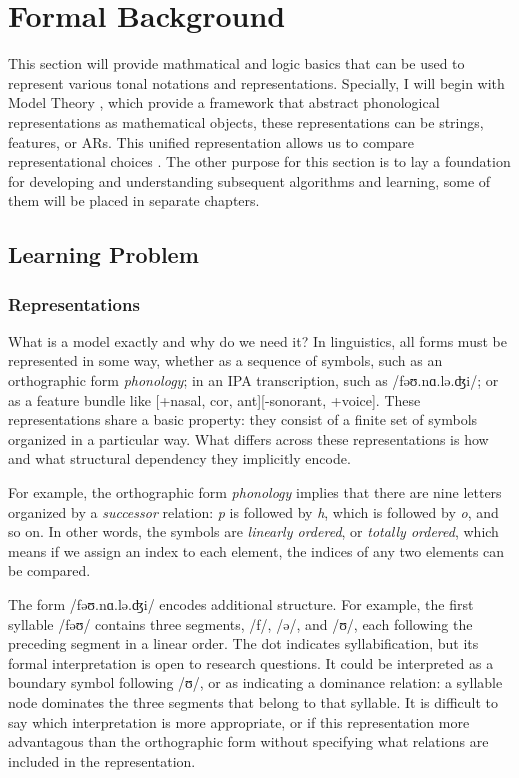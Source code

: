 \chapter{Formal Background} 
\label{chap:formal}
This section will provide mathmatical and logic basics that can be used
to represent various tonal notations and representations. Specially, I
will begin with Model Theory \citep{enderton2001mathematical}, which provide 
a framework that abstract phonological representations as mathematical 
objects, these representations can be strings, features, or ARs. This unified
representation allows us to compare representational choices
\citep{strother2017using, oakdenNotationalEquivalenceTonal2020, jardineetal20qtheoryAP}. The other purpose for this section is to lay a 
foundation for developing and understanding subsequent algorithms and learning,
some of them will be placed in separate chapters.

\section{Learning Problem}
\label{sec:formal-why}

\subsection{Representations}
What is a model exactly and why do we need it? In linguistics, all forms must be represented in 
some way, whether as a sequence of symbols, such as an orthographic form 
\textit{phonology}; in an IPA transcription, such as /fəʊ.nɑ.lə.ʤi/; or as a 
feature bundle like [+nasal, cor, ant][-sonorant, +voice]. These representations share a basic property: they consist of a finite 
set of symbols organized in a particular way. What differs across these 
representations is how and what structural dependency they implicitly 
encode. 

For example, the orthographic form \textit{phonology} 
implies that there are nine letters organized by a \textit{successor} relation: 
\textit{p} is followed by \textit{h}, which is followed by \textit{o}, 
and so on. In other words, the symbols are \textit{linearly ordered}, or
\textit{totally ordered}, which means if we assign an index to each element, the indices of any two elements can be compared.

The form /fəʊ.nɑ.lə.ʤi/ encodes additional structure. For example, the 
first syllable /fəʊ/ contains three segments, /f/, /ə/, and /ʊ/, each 
following the preceding segment in a linear order. The dot indicates 
syllabification, but its formal interpretation is open to research 
questions. It could be interpreted as a boundary symbol following /ʊ/, or 
as indicating a dominance relation: a syllable node dominates the three 
segments that belong to that syllable. It is difficult to say which 
interpretation is more appropriate, or if this representation more
advantagous than the orthographic form without specifying what relations 
are included in the representation.

